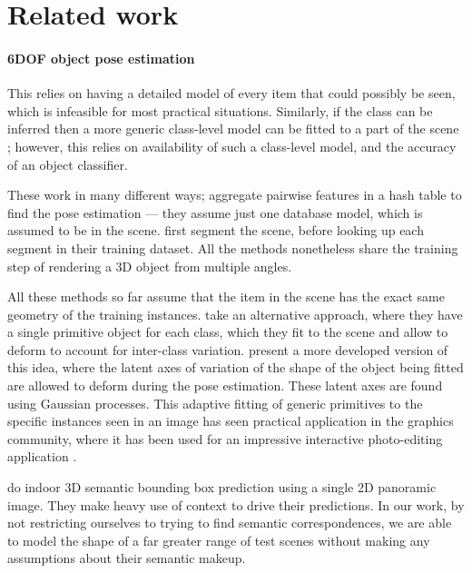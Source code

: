 \documentclass[10pt,twocolumn,letterpaper]{article}
\begin{document}
\section{Related work}

\paragraph{6DOF object pose estimation}

This relies on having a detailed model of every item that could possibly be seen, which is infeasible for most practical situations.
Similarly, if the class can be inferred then a more generic class-level model can be fitted to a part of the scene \cite{cocias-cgvcv-2013, prisacariu-iccv-2011}; however, this relies on availability of such a class-level model, and the accuracy of an object classifier.


These work in many different ways; \cite{drost-3dimpvt-2012} aggregate pairwise features in a hash table to find the pose estimation --- they assume just one database model, which is assumed to be in the scene. \cite{rusu-iros-2010} first segment the scene, before looking up each segment in their training dataset.
All the methods nonetheless share the training step of rendering a 3D object from multiple angles.

All these methods so far assume that the item in the scene has the exact same geometry of the training instances.
\cite{cocias-cgvcv-2013} take an alternative approach, where they have a single primitive object for each class, which they fit to the scene and allow to deform to account for inter-class variation.
\cite{prisacariu-iccv-2011} present a more developed version of this idea, where the latent axes of variation of the shape of the object being fitted are allowed to deform during the pose estimation. 
These latent axes are found using Gaussian processes.
This adaptive fitting of generic primitives to the specific instances seen in an image has seen practical application in the graphics community, where it has been used for an impressive interactive photo-editing application \cite{kholgade-siggraph-2014}.

\cite{zhang-eccv-2014} do indoor 3D semantic bounding box prediction using a single 2D panoramic image. They make heavy use of context to drive their predictions.
In our work, by not restricting ourselves to trying to find semantic correspondences, we are able to model the shape of a far greater range of test scenes without making any assumptions about their semantic makeup.
\end{document}
